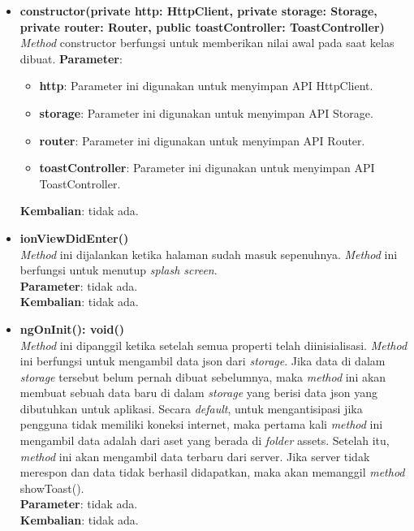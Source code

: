 \begin{enumerate}
	\begin{itemize}
		\item \textbf{constructor(private http: HttpClient, private storage: Storage, private router: Router, public toastController: ToastController)} \\
			\textit{Method} constructor berfungsi untuk memberikan nilai awal pada saat kelas dibuat.
			\textbf{Parameter}:
			\begin{itemize}
				\item \textbf{http}: Parameter ini digunakan untuk menyimpan API HttpClient.
				\item \textbf{storage}: Parameter ini digunakan untuk menyimpan API Storage.
				\item \textbf{router}: Parameter ini digunakan untuk menyimpan API Router.
				\item \textbf{toastController}: Parameter ini digunakan untuk menyimpan API ToastController.
			\end{itemize}
			\textbf{Kembalian}: tidak ada.
		
		\item \textbf{ionViewDidEnter()}\\
			\textit{Method} ini dijalankan ketika halaman sudah masuk sepenuhnya. \textit{Method} ini berfungsi untuk menutup \textit{splash screen}. \\
			\textbf{Parameter}: tidak ada. \\
			\textbf{Kembalian}: tidak ada.
			
		\item \textbf{ngOnInit(): void()} \\
			\textit{Method} ini dipanggil ketika setelah semua properti telah diinisialisasi. \textit{Method} ini berfungsi untuk mengambil data json dari \textit{storage}. Jika data di dalam \textit{storage} tersebut belum pernah dibuat sebelumnya, maka \textit{method} ini akan membuat sebuah data baru di dalam \textit{storage} yang berisi data json yang dibutuhkan untuk aplikasi. Secara \textit{default}, untuk mengantisipasi jika pengguna tidak memiliki koneksi internet, maka pertama kali \textit{method} ini mengambil data adalah dari aset yang berada di \textit{folder} assets. Setelah itu, \textit{method} ini akan mengambil data terbaru dari server. Jika server tidak merespon dan data tidak berhasil didapatkan, maka akan memanggil \textit{method} showToast(). \\
			\textbf{Parameter}: tidak ada. \\
			\textbf{Kembalian}: tidak ada.
			

\end{itemize}
\end{enumerate}

